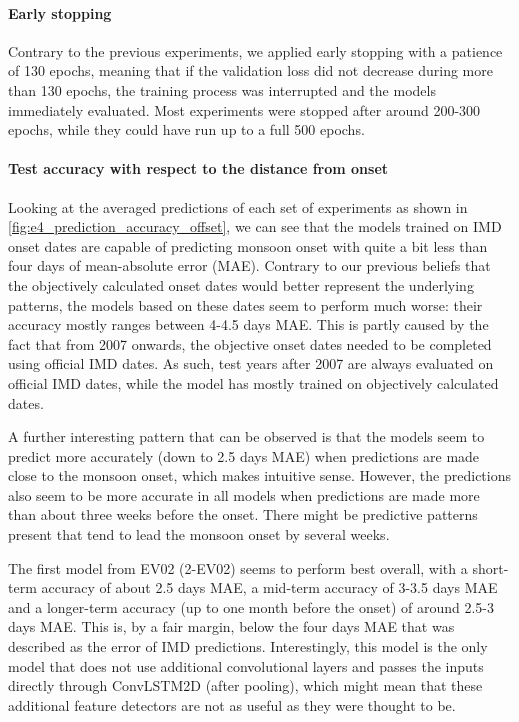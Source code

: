 \paragraph{Early stopping}
Contrary to the previous experiments, we applied early stopping with a patience of 130 epochs, meaning that if the validation loss did not decrease during more than 130 epochs, the training process was interrupted and the models immediately evaluated. Most experiments were stopped after around 200-300 epochs, while they could have run up to a full 500 epochs.

\paragraph{Test accuracy with respect to the distance from onset}
Looking at the averaged predictions of each set of experiments as shown in \cref{fig:e4_prediction_accuracy_offset}, we can see that the models trained on IMD onset dates are capable of predicting monsoon onset with quite a bit less than four days of mean-absolute error (MAE). Contrary to our previous beliefs that the objectively calculated onset dates would better represent the underlying patterns, the models based on these dates seem to perform much worse: their accuracy mostly ranges between 4-4.5 days MAE. This is partly caused by the fact that from 2007 onwards, the objective onset dates needed to be completed using official IMD dates. As such, test years after 2007 are always evaluated on official IMD dates, while the model has mostly trained on objectively calculated dates.

A further interesting pattern that can be observed is that the models seem to predict more accurately (down to 2.5 days MAE) when predictions are made close to the monsoon onset, which makes intuitive sense. However, the predictions also seem to be more accurate in all models when predictions are made more than about three weeks before the onset. There might be predictive patterns present that tend to lead the monsoon onset by several weeks.

The first model from EV02 (2-EV02) seems to perform best overall, with a short-term accuracy of about 2.5 days MAE, a mid-term accuracy of 3-3.5 days MAE and a longer-term accuracy (up to one month before the onset) of around 2.5-3 days MAE. This is, by a fair margin, below the four days MAE that was described as the error of IMD predictions. Interestingly, this model is the only model that does not use additional convolutional layers and passes the inputs directly through ConvLSTM2D (after pooling), which might mean that these additional feature detectors are not as useful as they were thought to be.

